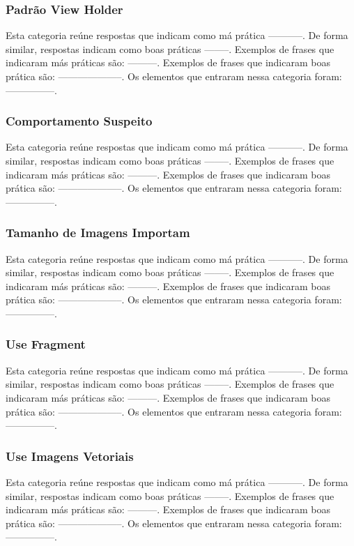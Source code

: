 \subsubsection{Padr\~ao View Holder}
Esta categoria re\'une respostas que indicam como m\'a pr\'atica -----------. De forma similar, respostas indicam como boas pr\'aticas --------. Exemplos de frases que indicaram m\'as pr\'aticas s\~ao: ---------. Exemplos de frases que indicaram boas pr\'atica s\~ao: --------------------. Os elementos que entraram nessa categoria foram: ---------------. 

\subsubsection{Comportamento Suspeito}
Esta categoria re\'une respostas que indicam como m\'a pr\'atica -----------. De forma similar, respostas indicam como boas pr\'aticas --------. Exemplos de frases que indicaram m\'as pr\'aticas s\~ao: ---------. Exemplos de frases que indicaram boas pr\'atica s\~ao: --------------------. Os elementos que entraram nessa categoria foram: ---------------. 

\subsubsection{Tamanho de Imagens Importam}
Esta categoria re\'une respostas que indicam como m\'a pr\'atica -----------. De forma similar, respostas indicam como boas pr\'aticas --------. Exemplos de frases que indicaram m\'as pr\'aticas s\~ao: ---------. Exemplos de frases que indicaram boas pr\'atica s\~ao: --------------------. Os elementos que entraram nessa categoria foram: ---------------. 

\subsubsection{Use Fragment}
Esta categoria re\'une respostas que indicam como m\'a pr\'atica -----------. De forma similar, respostas indicam como boas pr\'aticas --------. Exemplos de frases que indicaram m\'as pr\'aticas s\~ao: ---------. Exemplos de frases que indicaram boas pr\'atica s\~ao: --------------------. Os elementos que entraram nessa categoria foram: ---------------. 

\subsubsection{Use Imagens Vetoriais}
Esta categoria re\'une respostas que indicam como m\'a pr\'atica -----------. De forma similar, respostas indicam como boas pr\'aticas --------. Exemplos de frases que indicaram m\'as pr\'aticas s\~ao: ---------. Exemplos de frases que indicaram boas pr\'atica s\~ao: --------------------. Os elementos que entraram nessa categoria foram: ---------------. 

